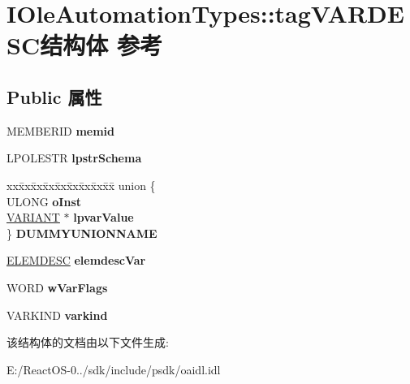 \hypertarget{struct_i_ole_automation_types_1_1tag_v_a_r_d_e_s_c}{}\section{I\+Ole\+Automation\+Types\+:\+:tag\+V\+A\+R\+D\+E\+S\+C结构体 参考}
\label{struct_i_ole_automation_types_1_1tag_v_a_r_d_e_s_c}
\subsection*{Public 属性}
\begin{DoxyCompactItemize}
\item 
\mbox{\label{struct_i_ole_automation_types_1_1tag_v_a_r_d_e_s_c_a4057883256a1334cef4ac801310e53af}} 
M\+E\+M\+B\+E\+R\+ID {\bfseries memid}
\item 
\mbox{\label{struct_i_ole_automation_types_1_1tag_v_a_r_d_e_s_c_a78f5f5e1c6dd5d624ea714099ea3211e}} 
L\+P\+O\+L\+E\+S\+TR {\bfseries lpstr\+Schema}
\item 
\mbox{\label{struct_i_ole_automation_types_1_1tag_v_a_r_d_e_s_c_a34a37596bddcd283c99154daa6ccd0c7}} 
\begin{tabbing}
xx\=xx\=xx\=xx\=xx\=xx\=xx\=xx\=xx\=\kill
union \{\\
\>ULONG {\bfseries oInst}\\
\>\hyperlink{structtag_v_a_r_i_a_n_t}{VARIANT} $\ast$ {\bfseries lpvarValue}\\
\} {\bfseries DUMMYUNIONNAME}\\

\end{tabbing}\item 
\mbox{\label{struct_i_ole_automation_types_1_1tag_v_a_r_d_e_s_c_afd61e47bbce9ed7921d4680ed5b6c822}} 
\hyperlink{struct_i_ole_automation_types_1_1tag_e_l_e_m_d_e_s_c}{E\+L\+E\+M\+D\+E\+SC} {\bfseries elemdesc\+Var}
\item 
\mbox{\label{struct_i_ole_automation_types_1_1tag_v_a_r_d_e_s_c_a5095fd95f6becb274f140f1128e9dad0}} 
W\+O\+RD {\bfseries w\+Var\+Flags}
\item 
\mbox{\label{struct_i_ole_automation_types_1_1tag_v_a_r_d_e_s_c_a98ff684886526b66596b15dc799f5087}} 
V\+A\+R\+K\+I\+ND {\bfseries varkind}
\end{DoxyCompactItemize}


该结构体的文档由以下文件生成\+:\begin{DoxyCompactItemize}
\item 
E\+:/\+React\+O\+S-\/0../sdk/include/psdk/oaidl.\+idl\end{DoxyCompactItemize}
